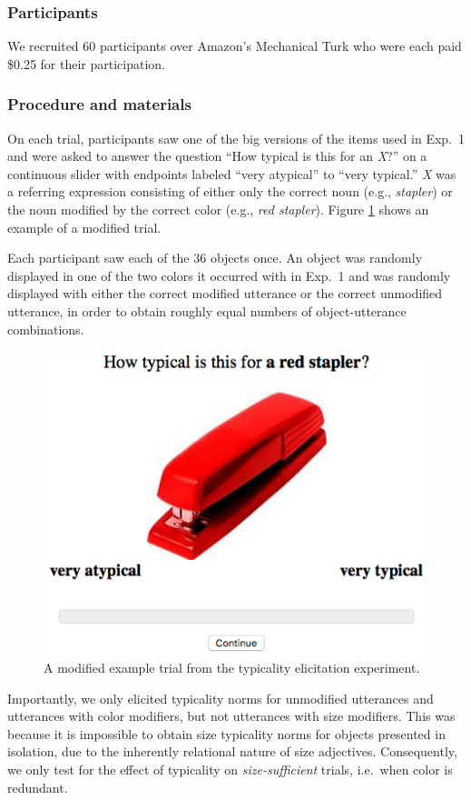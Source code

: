 \documentclass[11pt]{article}
\newcommand{\figref}[1]{Figure \ref{#1}}
\begin{document}
\subsubsection{Participants}

We recruited 60 participants over Amazon's Mechanical Turk who were each paid \$0.25 for their participation.

\subsubsection{Procedure and materials}

On each trial, participants saw one of the big versions of the items used in Exp.~1 and were asked to answer the question ``How typical is this for an \emph{X}?'' on a continuous slider with endpoints labeled ``very atypical'' to ``very typical.'' \emph{X} was a referring expression consisting of either only the correct noun (e.g., \emph{stapler}) or the noun modified by the correct color (e.g., \emph{red stapler}). \figref{fig:modifiertypstimulus} shows an example of a modified trial.

Each participant saw each of the 36 objects once. An object was randomly displayed in one of the two colors it occurred with in Exp.~1 and was randomly displayed with either the correct modified utterance or the correct unmodified utterance, in order to obtain roughly equal numbers of object-utterance combinations.

\begin{figure}
\centering
\includegraphics[width=.5\textwidth]{pics/redstapler.png}
\caption{A modified example trial from the typicality elicitation experiment.}
\label{fig:modifiertypstimulus}
\end{figure}

Importantly, we only elicited typicality norms for unmodified utterances and utterances with color modifiers, but not utterances with size modifiers. This was because it is impossible to obtain size typicality norms for objects presented in isolation, due to the inherently relational nature of size adjectives. Consequently, we only test for the effect of typicality on \emph{size-sufficient} trials, i.e.~when color is redundant. 
\end{document}
